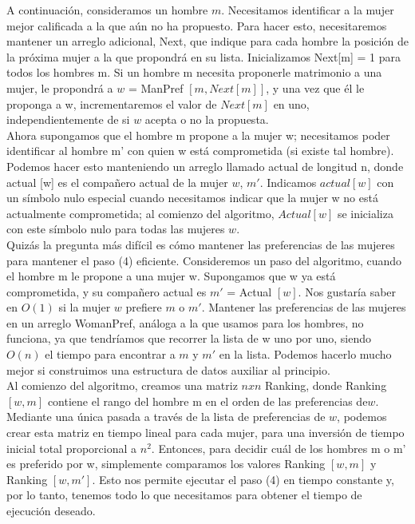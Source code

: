 \documentclass[a4paper, 12pt]{book}
\begin{document}
A continuación, consideramos un hombre $m$. Necesitamos identificar a la mujer mejor calificada a la que aún no ha propuesto. Para hacer esto, necesitaremos mantener un arreglo adicional, Next, que indique para cada hombre la posición de la próxima mujer a la que propondrá en su lista. Inicializamos Next[m] = 1 para todos los hombres m. Si un hombre m necesita proponerle matrimonio a una mujer, le propondrá a $w$ = ManPref $[m, Next [m]]$, y una vez que él le proponga a w, incrementaremos el valor de $Next[m]$ en uno, independientemente de si $w$ acepta o no la propuesta.\\

Ahora supongamos que el hombre m propone a la mujer w; necesitamos poder identificar al hombre m' con quien w está comprometida (si existe tal hombre). Podemos hacer esto manteniendo un arreglo llamado actual de longitud n, donde actual [w] es el compañero actual de la mujer $w$, $m'$. Indicamos $actual[w]$ con un símbolo nulo especial cuando necesitamos indicar que la mujer w no está actualmente comprometida; al comienzo del algoritmo, $Actual[w]$ se inicializa con este símbolo nulo para todas las mujeres $w$.\\

Quizás la pregunta más difícil es cómo mantener las preferencias de las mujeres para mantener el paso (4) eficiente. Consideremos un paso del algoritmo, cuando el hombre m le propone a una mujer w. Supongamos que w ya está comprometida, y su compañero actual es $m'$ = Actual $[w]$. Nos gustaría saber en $O(1)$ si la mujer $w$ prefiere $m$ o $m'$. Mantener las preferencias de las mujeres en un arreglo WomanPref, análoga a la que usamos para los hombres, no funciona, ya que tendríamos que recorrer la lista de w uno por uno, siendo $O(n)$ el tiempo para encontrar a $m$ y $m'$ en la lista. Podemos hacerlo mucho mejor si construimos una estructura de datos auxiliar al principio.\\


Al comienzo del algoritmo, creamos una matriz $n x n$ Ranking, donde Ranking$[w, m]$ contiene el rango del hombre m en el orden de las preferencias de$w$. Mediante una única pasada a través de la lista de preferencias de $w$, podemos crear esta matriz en tiempo lineal para cada mujer, para una inversión de tiempo inicial total proporcional a $n^2$. Entonces, para decidir cuál de los hombres m o m' es preferido por w, simplemente comparamos los valores Ranking $[w, m]$ y Ranking $[w, m']$. Esto nos permite ejecutar el paso (4) en tiempo constante y, por lo tanto, tenemos todo lo que necesitamos para obtener el tiempo de ejecución deseado.\\
\end{document}
